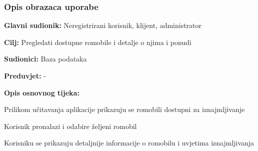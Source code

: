 			
				
				\subsubsection{Opis obrazaca uporabe}
					
					
					\noindent {}
					\begin{packed_item}
	
						\item \textbf{Glavni sudionik: }Neregistrirani korisnik, klijent, administrator 
						\item  \textbf{Cilj:} Pregledati dostupne romobile i detalje o njima i ponudi
						\item  \textbf{Sudionici:} Baza podataka
						\item  \textbf{Preduvjet:} -
						\item  \textbf{Opis osnovnog tijeka:}
						
						\item[] \begin{packed_enum}
	
							\item Prilikom učitavanja aplikacije prikazuju se romobili dostupni za iznajmljivanje
							\item Korisnik pronalazi i odabire željeni romobil
							\item Korisniku se prikazuju detaljnije informacije o romobilu i uvjetima iznajmljivanja
						
						\end{packed_enum}
					\end{packed_item}
						
